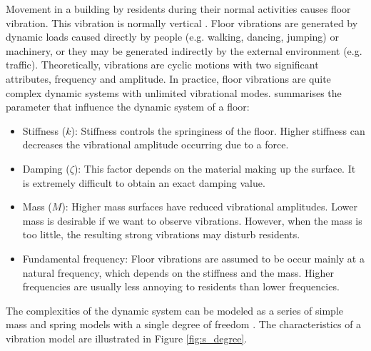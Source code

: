 Movement in a building by residents during their normal activities causes floor vibration. This vibration is normally vertical \cite{steelconstruction_2016}. Floor vibrations are generated by dynamic loads caused directly by people (e.g. walking, dancing, jumping) or machinery, or they may be generated indirectly by the external environment (e.g. traffic). Theoretically, vibrations are cyclic motions with two significant attributes, frequency and amplitude. In practice, floor vibrations are quite complex dynamic systems with unlimited vibrational modes. \citeauthor{ljunggren2006floor} \citeyear{ljunggren2006floor} summarises the parameter that influence the dynamic system of a floor:
\begin{itemize}
  \item Stiffness ($k$): Stiffness controls the springiness of the floor. Higher stiffness can decreases the vibrational amplitude occurring due to a force.
  \item Damping ($\zeta$): This factor depends on the material making up the surface. It is extremely difficult to obtain an exact damping value.
  \item Mass ($M$): Higher mass surfaces have reduced vibrational amplitudes. Lower mass is desirable if we want to observe vibrations. However, when the mass is too little, the resulting strong vibrations may disturb residents.
  \item Fundamental frequency: Floor vibrations are assumed to be occur mainly at a natural frequency, which depends on the stiffness and the mass. Higher frequencies are usually less annoying to residents than lower frequencies.
\end{itemize}

The complexities of the dynamic system can be modeled as a series of simple mass and spring models with a single degree of freedom \cite{p_gavin_2015}. The characteristics of a vibration model are illustrated in Figure \ref{fig:s_degree}.

